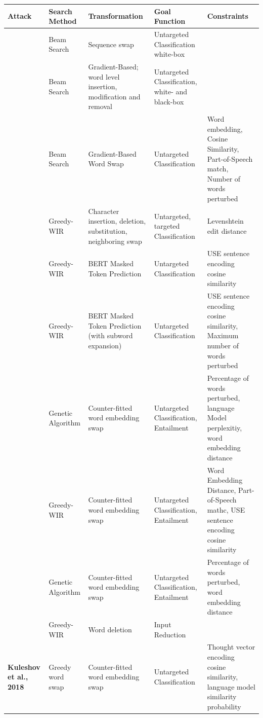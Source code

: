 \begin{table}
\begin{adjustwidth}{-0cm}{}
\small
\begin{tabular}{p{2cm}|p{2cm}p{3cm}p{2cm}p{4cm}}
\toprule
\textbf{Attack} &\textbf{Search Method} &\textbf{Transformation} &\textbf{Goal Function} &\textbf{Constraints}\\  
\midrule 
\textbf{\cite{papernot2016crafting}} & Beam Search &Sequence swap &Untargeted Classification white-box & \\
\midrule
\textbf{\cite{liang2017deep}} &Beam Search &Gradient-Based; word level insertion, modification and removal &Untargeted Classification, white- and black-box & \\
\midrule
\textbf{\cite{ebrahimi2017hotflip}}&Beam Search &Gradient-Based Word Swap &Untargeted Classification &Word embedding, Cosine Similarity, Part-of-Speech match, Number of words perturbed \\
\midrule
\textbf{\cite{gao2018black}} &Greedy-WIR &Character insertion, deletion, substitution, neighboring swap&Untargeted, targeted Classification &Levenshtein edit distance \\
\midrule
\textbf{\cite{garg2020bae}} &Greedy-WIR &BERT Masked Token Prediction &Untargeted Classification &USE sentence encoding cosine similarity \\
\midrule
\textbf{\cite{zhang2020generating}}&Greedy-WIR &BERT Masked Token Prediction (with subword expansion) &Untargeted Classification &USE sentence encoding cosine similarity, Maximum number of words perturbed \\
\midrule
\textbf{\cite{alzantot2018generating}} &Genetic Algorithm &Counter-fitted word embedding swap &Untargeted Classification, Entailment &Percentage of words perturbed, language Model perplexitiy, word embedding distance \\
\midrule
\textbf{\cite{jin2019bert}}&Greedy-WIR &Counter-fitted word embedding swap &Untargeted Classification, Entailment &Word Embedding Distance, Part-of-Speech mathc, USE sentence encoding cosine similarity \\
\midrule
\textbf{\cite{wang2019natural}} &Genetic Algorithm &Counter-fitted word embedding swap &Untargeted Classification, Entailment &Percentage of words perturbed, word embedding distance \\
\midrule
\textbf{\cite{feng2018pathologies}} &Greedy-WIR &Word deletion &Input Reduction & \\
\midrule
\textbf{Kuleshov et al., 2018} &Greedy word swap &Counter-fitted word embedding swap &Untargeted Classification &Thought vector encoding cosine similarity, language model similarity probability 

\end{tabular}
\end{adjustwidth}
\end{table}

